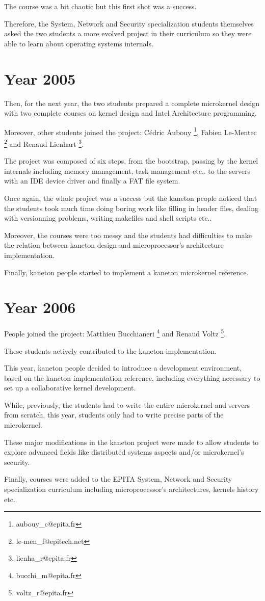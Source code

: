 The course was a bit chaotic but this first shot was a success.

Therefore, the System, Network and Security specialization students
themselves asked the two students a more evolved project in their
curriculum so they were able to learn about operating systems internals.

%
%

\section{Year 2005}

Then, for the next year, the two students prepared a complete microkernel
design with two complete courses on kernel design and Intel Architecture
programming.

Moreover, other students joined the project:
C\'edric Aubouy \footnote{aubouy\_c@epita.fr},
Fabien Le-Mentec \footnote{le-men\_f@epitech.net} and
Renaud Lienhart \footnote{lienha\_r@epita.fr}.

The project was composed of six steps, from the bootstrap, passing by
the kernel internals including memory management, task management etc..
to the servers with an IDE device driver and finally a FAT file system.

Once again, the whole project was a success but the kaneton people
noticed that the students took much time doing boring work like
filling in header files, dealing with versionning problems, writing
makefiles and shell scripts etc..

Moreover, the courses were too messy and the students had difficulties
to make the relation between kaneton design and microprocessor's
architecture implementation.

Finally, kaneton people started to implement a kaneton microkernel
reference.

%
%

\section{Year 2006}

People joined the project:
Matthieu Bucchianeri \footnote{bucchi\_m@epita.fr} and
Renaud Voltz \footnote{voltz\_r@epita.fr}.

These students actively contributed to the kaneton implementation.

This year, kaneton people decided to introduce a development environment,
based on the kaneton implementation reference, including everything
necessary to set up a collaborative kernel development.

While, previously, the students had to write the entire microkernel
and servers from scratch, this year, students only had to write precise
parts of the microkernel.

These major modifications in the kaneton project were made to
allow students to explore advanced fields like distributed systems
aspects and/or microkernel's security.

Finally, courses were added to the EPITA System, Network and Security
specialization curriculum including microprocessor's architectures,
kernels history etc..
